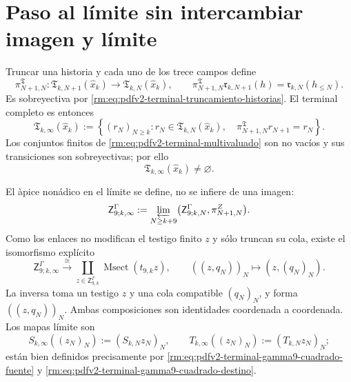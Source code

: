 \section{Paso al l\'imite sin intercambiar imagen y l\'imite}

Truncar una historia y cada uno de los trece campos define
\begin{equation}
\label{rm:eq:pdfv2-terminal-transicion-horizonte}
 \pi^{\mathfrak T}_{N+1,N}:
 \mathfrak T_{k,N+1}(\widehat x_k)\longrightarrow
 \mathfrak T_{k,N}(\widehat x_k),
 \qquad
 \pi^{\mathfrak T}_{N+1,N}\mathfrak r_{k,N+1}(h)
 =\mathfrak r_{k,N}(h_{\leq N}).
\end{equation}
Es sobreyectiva por
\eqref{rm:eq:pdfv2-terminal-truncamiento-historias}. El terminal completo es
entonces
\begin{equation}
\label{rm:eq:pdfv2-terminal-limite-inverso}
 \mathfrak T_{k,\infty}(\widehat x_k)
 :=\left\{(r_N)_{N\geq k}:
 r_N\in\mathfrak T_{k,N}(\widehat x_k),\quad
 \pi^{\mathfrak T}_{N+1,N}r_{N+1}=r_N\right\}.
\end{equation}
Los conjuntos finitos de
\eqref{rm:eq:pdfv2-terminal-multivaluado} son no vac\'ios y sus transiciones
son sobreyectivas; por ello
\begin{equation}
\label{rm:eq:pdfv2-terminal-limite-no-vacio}
 \mathfrak T_{k,\infty}(\widehat x_k)\neq\varnothing.
\end{equation}

El \`apice non\'adico en el l\'imite se define, no se infiere de una imagen:
\begin{equation}
\label{rm:eq:pdfv2-terminal-gamma9-apice-limite-raw}
 \mathsf Z^\Gamma_{9;k,\infty}
 :=\varprojlim_{N\geq k+9}
 \bigl(\mathsf Z^\Gamma_{9;k,N},\pi^Z_{N+1,N}\bigr).
\end{equation}
Como los enlaces no modifican el testigo finito \(z\) y s\'olo truncan su
cola, existe el isomorfismo expl\'icito
\begin{equation}
\label{rm:eq:pdfv2-terminal-gamma9-apice-limite-msect}
 \mathsf Z^\Gamma_{9;k,\infty}
 \xrightarrow{\ \cong\ }
 \coprod_{z\in\mathsf Z^\Gamma_{9,k}}
 \operatorname{Msect}(t_{9,k}z),\qquad
 ((z,q_N))_N\longmapsto(z,(q_N)_N).
\end{equation}
La inversa toma un testigo \(z\) y una cola compatible \((q_N)_N\), y forma
\(((z,q_N))_N\). Ambas composiciones son identidades coordenada a
coordenada. Los mapas l\'imite son
\begin{equation}
\label{rm:eq:pdfv2-terminal-gamma9-mapas-limite-raw}
 S_{k,\infty}((z_N)_N):=(S_{k,N}z_N)_N,\qquad
 T_{k,\infty}((z_N)_N):=(T_{k,N}z_N)_N;
\end{equation}
est\'an bien definidos precisamente por
\eqref{rm:eq:pdfv2-terminal-gamma9-cuadrado-fuente} y
\eqref{rm:eq:pdfv2-terminal-gamma9-cuadrado-destino}.

